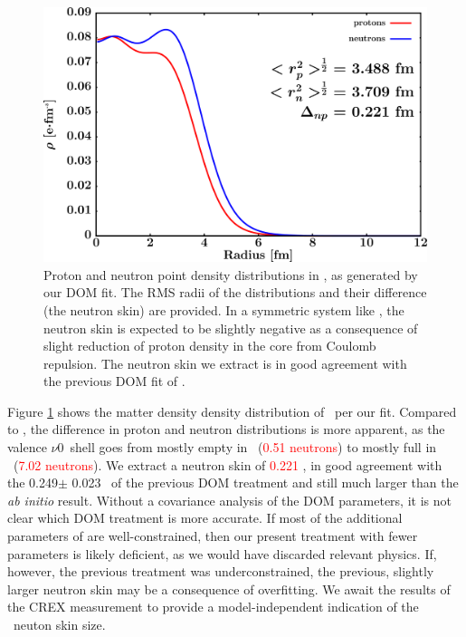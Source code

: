 \begin{figure}[tb]
    \centering
    \includegraphics[width=\textwidth]{figures/ca48_matterDensity.png}
    \caption[Proton and neutron matter density distributions in \caForty]
    {
        Proton and neutron point density distributions in \caForty, as
        generated by our DOM fit. The RMS radii of the distributions and their
        difference (the neutron skin) are provided. In a symmetric system like
        \caForty, the neutron skin is expected to be slightly negative as a
        consequence of slight reduction of proton density in the core from
        Coulomb repulsion. The neutron skin we extract is in good agreement with
        the previous DOM fit of \cite{MahzoonPhDThesis}.
    }
    \label{Ca48MatterDist}
\end{figure}

Figure \ref{Ca48MatterDist} shows the matter density density distribution of \caEight\ per
our fit. Compared to \caForty, the difference in proton and neutron distributions is more apparent,
as the valence $\nu$0\fSeven\ shell goes from mostly empty in \caForty\
(\textcolor{red}{0.51 neutrons}) to 
mostly full in \caForty\ (\textcolor{red}{7.02 neutrons}).
We extract a neutron skin of \textcolor{red}{0.221} \femto\meter,
in good agreement with the 0.249$\pm$ 0.023 \femto\meter\ of the previous DOM treatment
and still much larger than the \textit{ab initio} result. Without a covariance analysis of the DOM
parameters, it is not clear which DOM treatment is more accurate.
If most of the additional parameters of
\cite{MahzoonPhDThesis} are well-constrained, then our present treatment with fewer parameters is 
likely deficient, as we would have discarded relevant physics. If, however, the previous treatment
was underconstrained, the previous, slightly larger neutron skin
may be a consequence of overfitting. We
await the results of the CREX measurement to provide a model-independent indication
of the \caEight\ neuton skin size.

